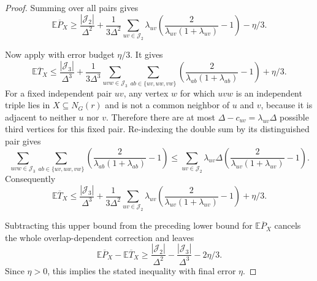 \begin{proof}
Summing over all pairs gives
\[
\mathbb E\overline P_X\ge
\frac{|\mathcal J_2|}{\Delta^2}
+\frac1{3\Delta^2}\sum_{uv\in\mathcal J_2}
\lambda_{uv}
\left(\frac{2}{\lambda_{uv}(1+\lambda_{uv})}-1\right)
-\eta/3 .
\]

Now apply  with error budget
$\eta/3$.  It gives
\[
\mathbb E\overline T_X\le
\frac{|\mathcal J_3|}{\Delta^3}
+\frac1{3\Delta^3}
\sum_{uvw\in\mathcal J_3}\sum_{ab\in\{uv,uw,vw\}}
\left(\frac{2}{\lambda_{ab}(1+\lambda_{ab})}-1\right)
+\eta/3 .
\]
For a fixed independent pair $uv$, any vertex $w$ for which $uvw$ is an
independent triple lies in $X\subseteq N_G(r)$ and is not a common neighbor
of $u$ and $v$, because it is adjacent to neither $u$ nor $v$.  Therefore
there are at most
$\Delta-c_{uv}=\lambda_{uv}\Delta$ possible third vertices for this fixed
pair.  Re-indexing the double sum by its distinguished pair gives
\[
\sum_{uvw\in\mathcal J_3}\sum_{ab\in\{uv,uw,vw\}}
\left(\frac{2}{\lambda_{ab}(1+\lambda_{ab})}-1\right)
\le
\sum_{uv\in\mathcal J_2}\lambda_{uv}\Delta
\left(\frac{2}{\lambda_{uv}(1+\lambda_{uv})}-1\right).
\]
Consequently
\[
\mathbb E\overline T_X\le
\frac{|\mathcal J_3|}{\Delta^3}
+\frac1{3\Delta^2}\sum_{uv\in\mathcal J_2}
\lambda_{uv}
\left(\frac{2}{\lambda_{uv}(1+\lambda_{uv})}-1\right)
+\eta/3 .
\]

Subtracting this upper bound from the preceding lower bound for
$\mathbb E\overline P_X$ cancels the whole overlap-dependent correction and
leaves
\[
\mathbb E\overline P_X-\mathbb E\overline T_X
\ge
\frac{|\mathcal J_2|}{\Delta^2}
-\frac{|\mathcal J_3|}{\Delta^3}
-2\eta/3 .
\]
Since $\eta>0$, this implies the stated inequality with final error
$\eta$.
\end{proof}
